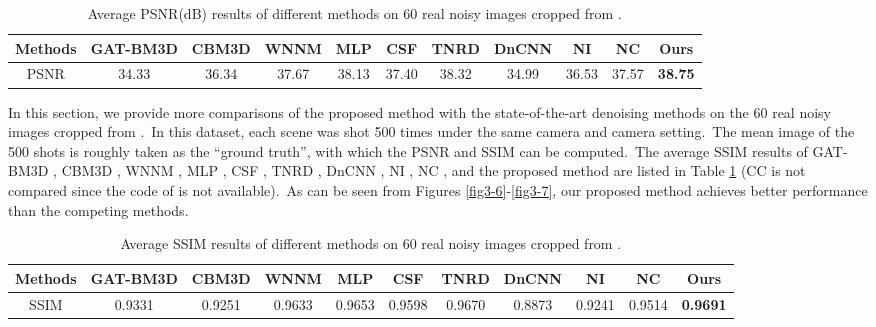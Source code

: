 \begin{table}
\begin{adjustwidth}{-1cm}{}
\scriptsize
\caption{Average PSNR(dB) results of different methods on 60 real noisy images cropped from \cite{crosschannel2016}.}
\vspace{-4mm}
\label{tab3-4}
\begin{center}
\renewcommand\arraystretch{1}
\begin{tabular}{|c||c|c|c|c|c|c|c|c|c|c|}
\hline
Methods
&\textbf{GAT-BM3D}
&\textbf{CBM3D}
&\textbf{WNNM}
&\textbf{MLP}
&\textbf{CSF} 
&\textbf{TNRD} 
&\textbf{DnCNN}
&\textbf{NI} 
&\textbf{NC} 
&\textbf{Ours} 
\\
\hline
PSNR  
& 34.33 & 36.34 & 37.67 & 38.13 & 37.40 & 38.32 & 34.99 & 36.53 & 37.57 & \textbf{38.75}
\\
\hline
\end{tabular}
\end{center}
\end{adjustwidth}
\end{table}

In this section, we provide more comparisons of the proposed method with the state-of-the-art denoising methods on the 60 real noisy images cropped from \cite{crosschannel2016}.\ In this dataset, each scene was shot 500 times under the same camera and camera setting.\ The mean image of the 500 shots is roughly taken as the ``ground truth'', with which the PSNR and SSIM can be computed.\ The average SSIM results of GAT-BM3D \cite{makitalo2013optimal}, CBM3D \cite{bm3d}, WNNM \cite{wnnm}, MLP \cite{mlp}, CSF \cite{csf}, TNRD \cite{tnrd}, DnCNN \cite{dncnn}, NI \cite{neatimage}, NC \cite{noiseclinic,ncwebsite}, and the proposed method are listed in Table \ref{tab3-4} (CC is not compared since the code of \cite{crosschannel2016} is not available).\ As can be seen from Figures \ref{fig3-6}-\ref{fig3-7}, our proposed method achieves better performance than the competing methods.

\begin{table}[htpb]
\begin{adjustwidth}{-1cm}{}
\scriptsize
\caption{Average SSIM \cite{ssim} results of different methods on 60 real noisy images cropped from \cite{crosschannel2016}.}
\label{tab3-5}
\begin{center}
\renewcommand\arraystretch{1}
\begin{tabular}{|c||c|c|c|c|c|c|c|c|c|c|}
\hline
Methods
&\textbf{GAT-BM3D}
&\textbf{CBM3D}
&\textbf{WNNM}
&\textbf{MLP}
&\textbf{CSF} 
&\textbf{TNRD} 
&\textbf{DnCNN}
&\textbf{NI} 
&\textbf{NC} 
&\textbf{Ours} 
\\
\hline
SSIM  
& 0.9331 & 0.9251 & 0.9633 & 0.9653 & 0.9598 & 0.9670 & 0.8873 & 0.9241 & 0.9514 & \textbf{0.9691}
\\
\hline
\end{tabular}
\end{center}
\end{adjustwidth}
\end{table}




